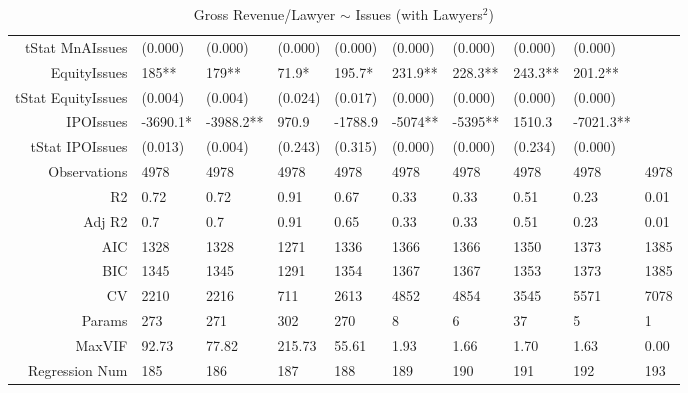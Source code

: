 \begin{table}[ht]
\begin{tabular}{rlllllllll}
  tStat MnAIssues & (0.000) & (0.000) & (0.000) & (0.000) & (0.000) & (0.000) & (0.000) & (0.000) &  \\ 
  EquityIssues & 185** & 179** & 71.9* & 195.7* & 231.9** & 228.3** & 243.3** & 201.2** &  \\ 
  tStat EquityIssues & (0.004) & (0.004) & (0.024) & (0.017) & (0.000) & (0.000) & (0.000) & (0.000) &  \\ 
  IPOIssues & -3690.1* & -3988.2** & 970.9 & -1788.9 & -5074** & -5395** & 1510.3 & -7021.3** &  \\ 
  tStat IPOIssues & (0.013) & (0.004) & (0.243) & (0.315) & (0.000) & (0.000) & (0.234) & (0.000) &  \\ 
  Observations & 4978 & 4978 & 4978 & 4978 & 4978 & 4978 & 4978 & 4978 & 4978 \\ 
  R2 & 0.72 & 0.72 & 0.91 & 0.67 & 0.33 & 0.33 & 0.51 & 0.23 & 0.01 \\ 
  Adj R2 & 0.7 & 0.7 & 0.91 & 0.65 & 0.33 & 0.33 & 0.51 & 0.23 & 0.01 \\ 
  AIC & 1328 & 1328 & 1271 & 1336 & 1366 & 1366 & 1350 & 1373 & 1385 \\ 
  BIC & 1345 & 1345 & 1291 & 1354 & 1367 & 1367 & 1353 & 1373 & 1385 \\ 
  CV & 2210 & 2216 & 711 & 2613 & 4852 & 4854 & 3545 & 5571 & 7078 \\ 
  Params & 273 & 271 & 302 & 270 & 8 & 6 & 37 & 5 & 1 \\ 
  MaxVIF & 92.73 & 77.82 & 215.73 & 55.61 & 1.93 & 1.66 & 1.70 & 1.63 & 0.00 \\ 
  Regression Num & 185 & 186 & 187 & 188 & 189 & 190 & 191 & 192 & 193 \\ 
   \hline
\end{tabular}
\caption{Gross Revenue/Lawyer $\sim$ Issues (with Lawyers$^2$)} 
\end{table}
